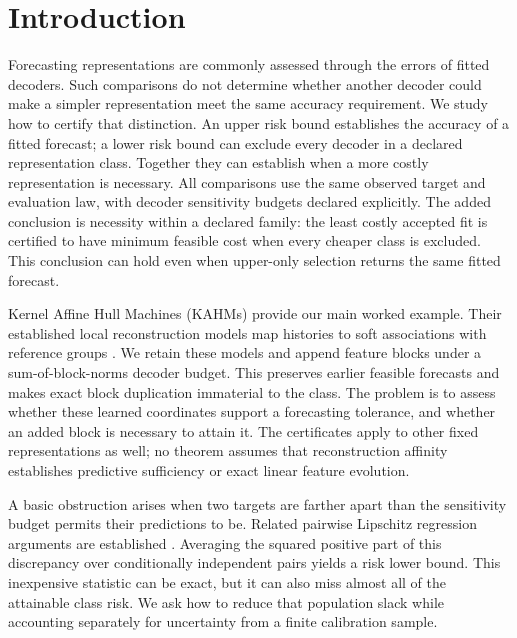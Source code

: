 \section{Introduction}
\label{sec:introduction}

Forecasting representations are commonly assessed through the errors of fitted
decoders. Such comparisons do not determine whether another decoder could make
a simpler representation meet the same accuracy requirement. We study how to
certify that distinction. An upper risk bound establishes the accuracy of a
fitted forecast; a lower risk bound can exclude every decoder in a declared
representation class. Together they can establish when a more costly
representation is necessary. All comparisons use the same observed target
and evaluation law, with decoder sensitivity budgets declared explicitly.
The added conclusion is necessity within a declared family: the least costly
accepted fit is certified to have minimum feasible cost when every cheaper
class is excluded. This conclusion can hold even when upper-only selection returns
the same fitted forecast.

Kernel Affine Hull Machines (KAHMs) provide our main worked example.
Their established local reconstruction models map histories to soft
associations with reference groups
\citep{kumar2024kahm,kumar2025collaborative,kumar2026limits}.
We retain these models and append feature blocks under a sum-of-block-norms
decoder budget. This preserves earlier feasible forecasts and makes exact
block duplication immaterial to the class. The problem is to assess whether
these learned coordinates support a forecasting tolerance, and whether an
added block is necessary to attain it. The certificates apply to other fixed
representations as well; no theorem assumes that reconstruction affinity
establishes predictive sufficiency or exact linear feature evolution.

A basic obstruction arises when two targets are farther apart than the
sensitivity budget permits their predictions to be. Related pairwise
Lipschitz regression arguments are established \citep{akash2021inverse}.
Averaging the squared positive part of this discrepancy over conditionally
independent pairs yields a risk lower bound. This inexpensive statistic can
be exact, but it can also miss almost all of the attainable class risk.
We ask how to reduce that population slack while accounting separately for
uncertainty from a finite calibration sample.

